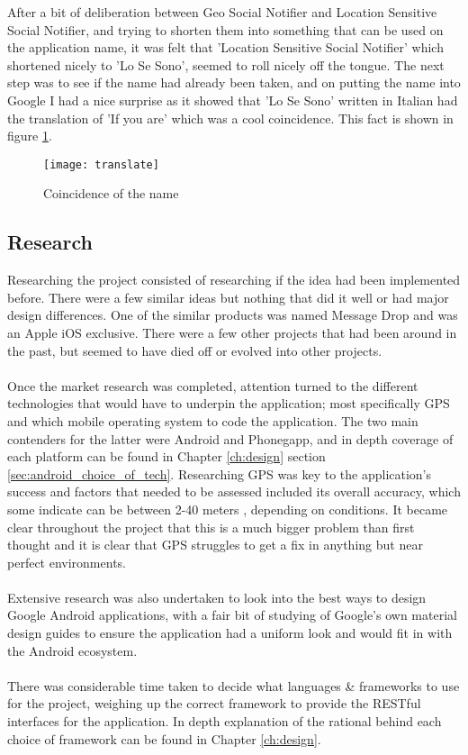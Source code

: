 After a bit of deliberation between Geo Social Notifier and Location Sensitive Social Notifier, and trying to shorten them into something that can be used on the application name, it was felt that 'Location Sensitive Social Notifier' which shortened nicely to 'Lo Se Sono', seemed to roll nicely off the tongue. The next step was to see if the name had already been taken, and on putting the name into Google I had a nice surprise as it showed that 'Lo Se Sono' written in Italian had the translation of 'If you are' which was a cool coincidence. This fact is shown in figure \ref{fig:google_translate}.

\begin{figure}[H]
    \centering
    \texttt{[image: translate]}
    \caption{Coincidence of the name}
    \label{fig:google_translate}
\end{figure} 

\subsection{Research}

Researching the project consisted of researching if the idea had been implemented before. There were a few similar ideas but nothing that did it well or had major design differences. One of the similar products was named Message Drop \cite{dmt:dropmessageteam:2015:online} and was an Apple iOS exclusive. There were a few other projects that had been around in the past, but seemed to have died off or evolved into other projects.\\
\\
Once the market research was completed, attention turned to the different technologies that would have to underpin the application; most specifically GPS and which mobile operating system to code the application. The two main contenders for the latter were Android and Phonegapp, and in depth coverage of each platform can be found in Chapter \ref{ch:design} section \ref{sec:android_choice_of_tech}. Researching GPS was key to the application's success and factors that needed to be assessed included its overall accuracy, which some indicate can be between 2-40 meters \cite{DevdattaTengshe:gpsacuracy:2012:online}, depending on conditions. It became clear throughout the project that this is a much bigger problem than first thought and it is clear that GPS struggles to get a fix in anything but near perfect environments.\\
\\
Extensive research was also undertaken to look into the best ways to design Google Android applications, with a fair bit of studying of Google's own material design guides to ensure the application had a uniform look and would fit in with the Android ecosystem.\\
\\
There was considerable time taken to decide what languages \& frameworks to use for the project, weighing up the correct framework to provide the RESTful interfaces for the application. In depth explanation of the rational behind each choice of framework can be found in Chapter \ref{ch:design}.

